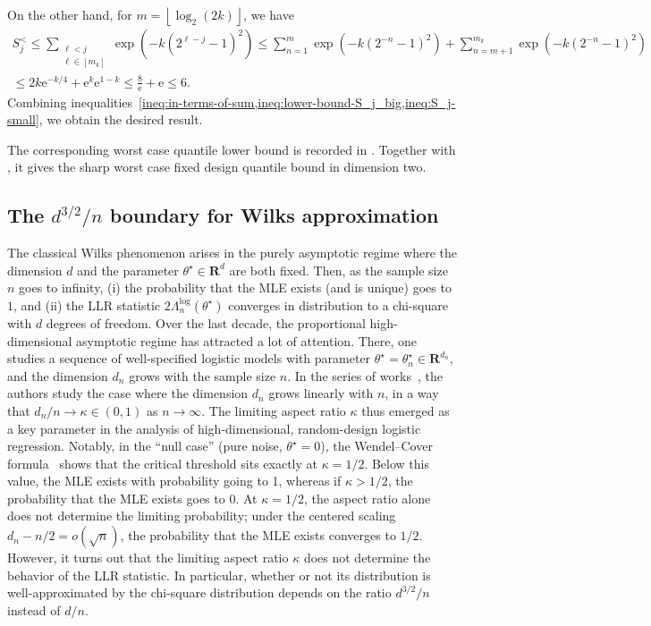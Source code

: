 \documentclass[11pt, letterpaper, hidelinks]{article}
\makeatletter
\renewcommand{\proofname}{\textit{\textbf{Proof}}}
\renewenvironment{proof}[1][\proofname]{\par\pushQED{\qed}\normalfont \topsep6\p@\@plus6\p@\relax\trivlist\item[\hskip\labelsep#1\@addpunct{}]\ignorespaces}{\popQED\endtrivlist\@endpefalse}
\newcommand{\R}{\mathbf R}
\newcommand{\floor}[1]{\left\lfloor #1 \right\rfloor}
\newcommand{\e}{\mathrm{e}}
\newcommand{\1}{\mathbf 1}
\renewcommand{\leq}{\leqslant}
\theoremstyle{plain}
\theoremstyle{definition}
\newcommand{\thetastar}{\theta^\star}
\makeatother
\begin{document}
\begin{proof}[Proof of~\Cref{lem:a-single-block}]
\begin{equation}
\end{equation}
On the other hand, for $m = \floor{\log_2(2k)}$, we have 
\begin{multline}
\label{ineq:S_j-small}
S_j^{<} \leq \sum_{\substack{\ell < j\\ \ell \in [m_k]}}
\exp(-k(2^{\ell - j} - 1)^2)
\leq \sum_{n = 1}^{m} 
\exp(-k(2^{-n} - 1)^2)
+ \sum_{n=m+1}^{m_k}\exp(-k(2^{-n} - 1)^2)
\\
\leq 2k \e^{-k/4} + \e^k\e^{1-k} \leq \frac{8}{\e} + \e \leq 6.
\end{multline}
Combining inequalities~\cref{ineq:in-terms-of-sum,ineq:lower-bound-S_j_big,ineq:S_j-small}, we obtain the desired result.

\end{proof}

The corresponding worst case quantile lower bound is recorded in
. Together with
, it gives the sharp worst case fixed design
quantile bound in dimension two.

\subsection{The \(d^{3/2}/n\) boundary for Wilks approximation}
\label{sec:wilksregime}

The classical Wilks phenomenon arises in the purely asymptotic regime where the dimension $d$ and the parameter $\thetastar \in \R^{d}$ are both fixed. Then, as the sample size $n$ goes to infinity, (i) the probability that the MLE exists (and is unique) goes to $1$, and (ii) the LLR statistic $2 \Lambda_n^{\log}(\thetastar)$ converges in distribution to a chi-square with $d$ degrees of freedom.
Over the last decade, the proportional high-dimensional asymptotic regime has attracted a lot of attention. There, one studies a sequence of well-specified logistic models with parameter $\thetastar = \thetastar_n \in \R^{d_n}$, and the dimension $d_n$ grows with the sample size $n$.
In the series of works~\cite{sur2019modern,sur2019likelihood}, the authors study the case where the dimension $d_n$ grows linearly with $n$, in a way that $d_n /n \to \kappa \in (0,1)$ as $n \to \infty$.
The limiting aspect ratio $\kappa$ thus emerged as a key parameter in the analysis of high-dimensional, random-design logistic regression. Notably, in the ``null case'' (pure noise, $\thetastar = 0$), the Wendel--Cover formula~\cite{Wendel1962,Cover1965} shows that the critical threshold sits exactly at $\kappa = 1/2$. Below this value, the MLE exists with probability going to 1, whereas if $\kappa >1/2$, the probability that the MLE exists goes to $0$. At $\kappa=1/2$, the aspect ratio alone does not determine the limiting probability; under the centered scaling $d_n-n/2=o(\sqrt n)$, the probability that the MLE exists converges to $1/2$.
However, it turns out that the limiting aspect ratio $\kappa$ does not determine the behavior of the LLR statistic. In particular, whether or not its distribution is well-approximated by the chi-square distribution depends on the ratio $d^{3/2}/n$ instead of $d/n$.
\end{document}
